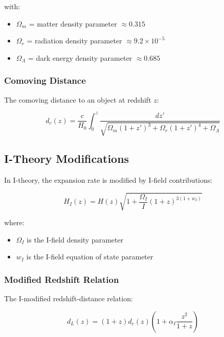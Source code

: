 with:
\begin{itemize}
    \item $\Omega_m$ = matter density parameter $\approx 0.315$
    \item $\Omega_r$ = radiation density parameter $\approx 9.2 \times 10^{-5}$
    \item $\Omega_\Lambda$ = dark energy density parameter $\approx 0.685$
\end{itemize}

\subsubsection{Comoving Distance}

The comoving distance to an object at redshift $z$:

\begin{equation}
\label{eq:comoving_distance}
d_c(z) = \frac{c}{H_0} \int_0^z \frac{dz'}{\sqrt{\Omega_m(1+z')^3 + \Omega_r(1+z')^4 + \Omega_\Lambda}}
\end{equation}

\subsection{I-Theory Modifications}

In I-theory, the expansion rate is modified by I-field contributions:

\begin{equation}
\label{eq:i_modified_hubble}
H_I(z) = H(z) \sqrt{1 + \frac{\Omega_I}{I}(1+z)^{3(1+w_I)}}
\end{equation}

where:
\begin{itemize}
    \item $\Omega_I$ is the I-field density parameter
    \item $w_I$ is the I-field equation of state parameter
\end{itemize}

\subsubsection{Modified Redshift Relation}

The I-modified redshift-distance relation:

\begin{equation}
\label{eq:i_redshift_distance}
d_L(z) = (1+z) d_c(z) \left(1 + \alpha_I \frac{z^2}{1+z}\right)
\end{equation}

